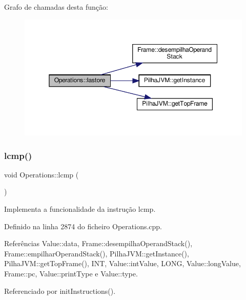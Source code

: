 Grafo de chamadas desta função\+:\nopagebreak
\begin{figure}[H]
\begin{center}
\leavevmode
\includegraphics[width=350pt]{classOperations_a562813150c331183212c11e5593b83c6_cgraph}
\end{center}
\end{figure}
\mbox{\label{classOperations_a7ad4ad0e417096686b55dde9142b830a}} 
\subsubsection{\texorpdfstring{lcmp()}{lcmp()}}
{\footnotesize\ttfamily void Operations\+::lcmp (\begin{DoxyParamCaption}{ }\end{DoxyParamCaption})\hspace{0.3cm}{\ttfamily [private]}}



Implementa a funcionalidade da instrução lcmp. 



Definido na linha 2874 do ficheiro Operations.\+cpp.



Referências Value\+::data, Frame\+::desempilha\+Operand\+Stack(), Frame\+::empilhar\+Operand\+Stack(), Pilha\+J\+V\+M\+::get\+Instance(), Pilha\+J\+V\+M\+::get\+Top\+Frame(), I\+NT, Value\+::int\+Value, L\+O\+NG, Value\+::long\+Value, Frame\+::pc, Value\+::print\+Type e Value\+::type.



Referenciado por init\+Instructions().

